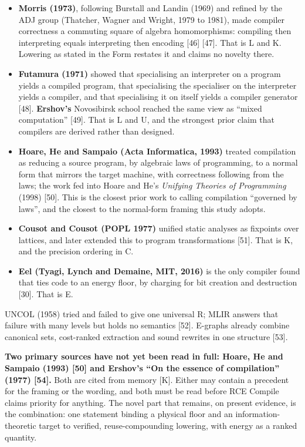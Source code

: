\documentclass[10pt,letterpaper]{article}
\providecommand{\tightlist}{\setlength{\itemsep}{1pt}\setlength{\parskip}{0pt}}
\begin{document}
\begin{itemize}
\tightlist
\item
  \textbf{Morris (1973)}, following Burstall and Landin (1969) and
  refined by the ADJ group (Thatcher, Wagner and Wright, 1979 to 1981),
  made compiler correctness a commuting square of algebra homomorphisms:
  compiling then interpreting equals interpreting then encoding {[}46{]}
  {[}47{]}. That is L and K. Lowering as stated in the Form restates it
  and claims no novelty there.
\item
  \textbf{Futamura (1971)} showed that specialising an interpreter on a
  program yields a compiled program, that specialising the specialiser
  on the interpreter yields a compiler, and that specialising it on
  itself yields a compiler generator {[}48{]}. \textbf{Ershov's}
  Novosibirsk school reached the same view as ``mixed computation''
  {[}49{]}. That is L and U, and the strongest prior claim that
  compilers are derived rather than designed.
\item
  \textbf{Hoare, He and Sampaio (Acta Informatica, 1993)} treated
  compilation as reducing a source program, by algebraic laws of
  programming, to a normal form that mirrors the target machine, with
  correctness following from the laws; the work fed into Hoare and He's
  \emph{Unifying Theories of Programming} (1998) {[}50{]}. This is the
  closest prior work to calling compilation ``governed by laws'', and
  the closest to the normal-form framing this study adopts.
\item
  \textbf{Cousot and Cousot (POPL 1977)} unified static analyses as
  fixpoints over lattices, and later extended this to program
  transformations {[}51{]}. That is K, and the precision ordering in C.
\item
  \textbf{Eel (Tyagi, Lynch and Demaine, MIT, 2016)} is the only
  compiler found that ties code to an energy floor, by charging for bit
  creation and destruction {[}30{]}. That is E.
\end{itemize}

UNCOL (1958) tried and failed to give one universal R; MLIR answers that
failure with many levels but holds no semantics {[}52{]}. E-graphs
already combine canonical sets, cost-ranked extraction and sound
rewrites in one structure {[}53{]}.

\textbf{Two primary sources have not yet been read in full: Hoare, He
and Sampaio (1993) {[}50{]} and Ershov's ``On the essence of
compilation'' (1977) {[}54{]}.} Both are cited from memory {[}K{]}.
Either may contain a precedent for the framing or the wording, and both
must be read before RCE Compile claims priority for anything. The novel
part that remains, on present evidence, is the combination: one
statement binding a physical floor and an information-theoretic target
to verified, reuse-compounding lowering, with energy as a ranked
quantity.
\end{document}
